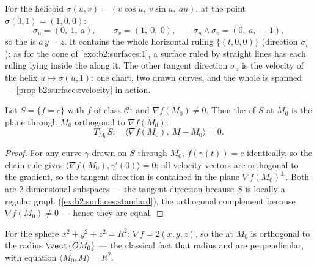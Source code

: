 \begin{example}
\label{ex:b2:surfaces:helicoidtangent}
For the helicoid $\sigma(u, v) = (v\cos u,\ v\sin u,\ au)$,
at the point $\sigma(0, 1) = (1, 0, 0)$:
\[
\sigma_u = (0,\ 1,\ a), \qquad \sigma_v = (1,\ 0,\ 0),
\qquad
\sigma_u \wedge \sigma_v = (0,\ a,\ -1),
\]
so the  is $a\,y = z$. It contains the whole
horizontal ruling $\{(t, 0, 0)\}$ (direction $\sigma_v$): as
for the cone of \cref{exo:b2:surfaces:1}, a surface ruled by
straight lines has each ruling lying inside the  along it. The other tangent direction $\sigma_u$ is the
velocity of the helix $u \mapsto \sigma(u, 1)$: one chart,
two drawn curves, and the whole  is spanned ---
\cref{prop:b2:surfaces:velocity} in action.
\end{example}

\begin{proposition}\label{prop:b2:surfaces:gradient}
Let $S = \{f = c\}$ with $f$ of class $\mathcal{C}^1$ and $\nabla
f(M_0) \neq 0$. Then the  of $S$ at $M_0$ is the
plane through $M_0$ orthogonal to $\nabla f(M_0)$:
\[
T_{M_0}S :\quad
\langle \nabla f(M_0),\ M - M_0\rangle = 0 .
\]
\end{proposition}

\begin{proof}
For any curve $\gamma$ drawn on $S$ through $M_0$, $f(\gamma(t)) =
c$ identically, so the chain rule gives $\langle
\nabla f(M_0), \gamma'(0)\rangle = 0$: all velocity vectors are
orthogonal to the gradient, so the tangent direction is contained
in the plane $\nabla f(M_0)^\perp$. Both are $2$-dimensional
subspaces --- the tangent direction because $S$ is locally a
regular graph (\cref{ex:b2:surfaces:standard}), the orthogonal
complement because $\nabla f(M_0) \neq 0$ --- hence they are
equal.
\end{proof}

\begin{example}\label{ex:b2:surfaces:spheretangent}
For the sphere $x^2 + y^2 + z^2 = R^2$: $\nabla f = 2(x, y, z)$,
so the  at $M_0$ is orthogonal to the radius
$\vect{OM_0}$ --- the classical fact that radius and 
are perpendicular, with equation $\langle M_0, M\rangle = R^2$.
\end{example}

